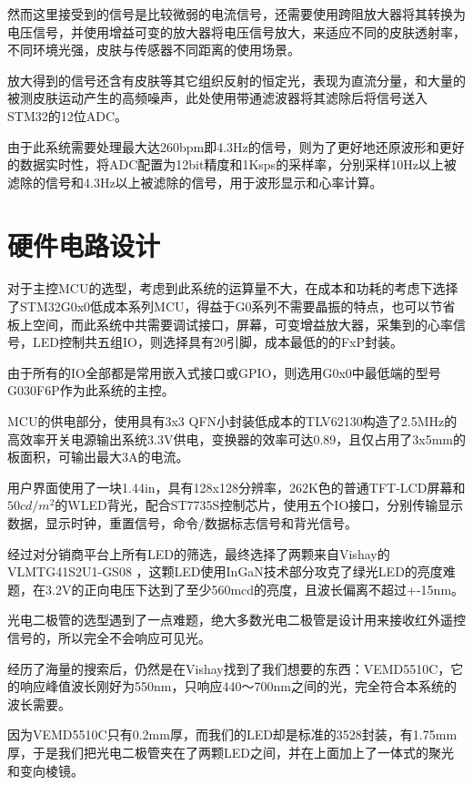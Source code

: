 \documentclass[a4paper]{ctexart}
\begin{document}
	然而这里接受到的信号是比较微弱的电流信号，还需要使用跨阻放大器将其转换为电压信号，并使用增益可变的放大器将电压信号放大，来适应不同的皮肤透射率，不同环境光强，皮肤与传感器不同距离的使用场景。
	
	放大得到的信号还含有皮肤等其它组织反射的恒定光，表现为直流分量，和大量的被测皮肤运动产生的高频噪声，此处使用带通滤波器将其滤除后将信号送入STM32的12位ADC。
	
	由于此系统需要处理最大达260bpm即4.3Hz的信号，则为了更好地还原波形和更好的数据实时性，将ADC配置为12bit精度和1Ksps的采样率，分别采样10Hz以上被滤除的信号和4.3Hz以上被滤除的信号，用于波形显示和心率计算。
	
	\cite{Activity:HRM Circuit}
	\cite{HRM Circuit}

\newpage
\section{硬件电路设计}

	对于主控MCU的选型，考虑到此系统的运算量不大，在成本和功耗的考虑下选择了STM32G0x0低成本系列MCU，得益于G0系列不需要晶振的特点，也可以节省板上空间，而此系统中共需要调试接口，屏幕，可变增益放大器，采集到的心率信号，LED控制共五组IO，则选择具有20引脚，成本最低的的FxP封装。
	
	由于所有的IO全部都是常用嵌入式接口或GPIO，则选用G0x0中最低端的型号G030F6P作为此系统的主控。
	
	MCU的供电部分，使用具有3x3 QFN小封装低成本的TLV62130构造了2.5MHz的高效率开关电源输出系统3.3V供电，变换器的效率可达0.89，且仅占用了3x5mm的板面积，可输出最大3A的电流。
	
	用户界面使用了一块1.44in，具有128x128分辨率，262K色的普通TFT-LCD屏幕和 $50cd/m^2$的WLED背光，配合ST7735S控制芯片，使用五个IO接口，分别传输显示数据，显示时钟，重置信号，命令/数据标志信号和背光信号。
	
	经过对分销商平台上所有LED的筛选，最终选择了两颗来自Vishay的 VLMTG41S2U1-GS08 ，这颗LED使用InGaN技术部分攻克了绿光LED的亮度难题，在3.2V的正向电压下达到了至少560mcd的亮度，且波长偏离不超过+-15nm。
	
	光电二极管的选型遇到了一点难题，绝大多数光电二极管是设计用来接收红外遥控信号的，所以完全不会响应可见光。
	
	经历了海量的搜索后，仍然是在Vishay找到了我们想要的东西：VEMD5510C，它的响应峰值波长刚好为550nm，只响应440～700nm之间的光，完全符合本系统的波长需要。
	
	因为VEMD5510C只有0.2mm厚，而我们的LED却是标准的3528封装，有1.75mm厚，于是我们把光电二极管夹在了两颗LED之间，并在上面加上了一体式的聚光和变向棱镜。
	
\end{document}
